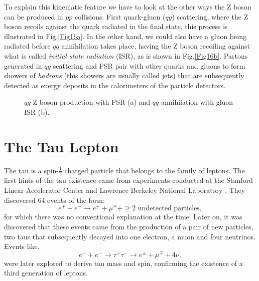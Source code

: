 To explain this kinematic feature we have to look at the other ways the Z boson can be produced in $pp$ collisions. First quark-gluon ($qg$) scattering, where the Z boson recoils against the quark radiated in the final state, this process is illustrated in Fig.\ref{Fig16a}. In the other hand, we could also have a gluon being radiated before $q\bar{q}$ annihilation takes place, having the Z boson recoiling against what is called \textit{initial state radiation} (ISR), as is shown in Fig.\ref{Fig16b}. Partons generated in $qg$ scattering and FSR pair with other quarks and gluons to form showers of \textit{hadrons} (this showers are usually called jets) that are subsequently detected as energy deposits in the calorimeters of the particle detectors. 
\begin{figure}[ht]
	\centering
	\hfill
	\caption{$qg$ Z boson production with FSR (a) and $q\bar{q}$ annihilation with gluon ISR (b).}
	\label{Fig16}
\end{figure}
\section{The Tau Lepton}\label{chap2sec1}
The tau is a spin-$\frac{1}{2}$ charged particle that belongs to the family of leptons. The first hints of the tau existence came from experiments conducted at the Stanford Linear Accelerator Center and Lawrence Berkeley National Laboratory \cite{PhysRevLett.35.1489}. They discovered 64 events of the form:
\begin{equation}
	e^+ + e^- \to e^\pm + \mu^\mp + \geq \text{2 undetected particles},
\end{equation}
for which there was no conventional explanation at the time. Later on, it was discovered that these events came from the production of a pair of new particles, two taus that subsequently decayed into one electron, a muon and four neutrinos. Events like,
\begin{equation}
e^+ + e^- \to \tau^+ \tau^- \to e^\pm + \mu^\mp + 4\nu,
\end{equation}	
were later explored to derive tau mass and spin, confirming the existence of a third generation of leptons. 

